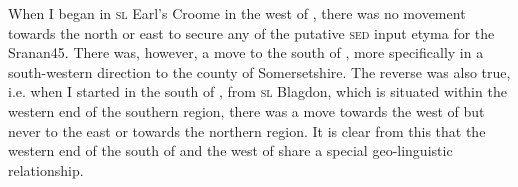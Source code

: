 \begin{figure}
\end{figure}


When I began in \textsc{sl} Earl's Croome in the west of , there was no movement towards the north or east to secure any of the putative \textsc{sed} input etyma for the Sranan45. There was, however, a move to the south of , more specifically in a south-western direction to the county of Somersetshire. The reverse was also true, i.e. when I started in the south of , from \textsc{sl} Blagdon, which is situated within the western end of the southern region, there was a move towards the west of  but never to the east or towards the northern region. It is clear from this that the western end of the south of  and the west of  share a special geo-linguistic relationship.

